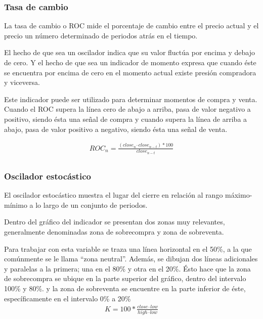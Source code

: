 
\pagebreak

\subsubsection*{Tasa de cambio}
La tasa de cambio o ROC mide el porcentaje de cambio entre el precio actual y el precio un número determinado de periodos atrás en el tiempo.

El hecho de que sea un oscilador indica que su valor fluctúa por encima y debajo de cero. Y el hecho de que sea un indicador de momento expresa que cuando éste se encuentra por encima de cero en el momento actual existe presión compradora y viceversa.

Este indicador puede ser utilizado para determinar momentos de compra y venta. Cuando el ROC supera la línea cero de abajo a arriba, pasa de valor negativo a positivo, siendo ésta  una señal de compra y cuando supera la línea de arriba a abajo, pasa de valor positivo a negativo, siendo ésta  una señal de venta.

\begin{gather*}
\label{eqn:ROC}
ROC_n = \frac{(close_n – close_{n-t}) * 100}{close_{n-t}}\\
\end{gather*}


\pagebreak




\subsubsection*{Oscilador estocástico}
El oscilador estocástico muestra el lugar del cierre en relación al rango máximo-mínimo a lo largo de un conjunto de periodos. 

Dentro del gráfico del indicador se presentan dos zonas muy relevantes, generalmente denominadas zona de sobrecompra y zona de sobreventa.

Para trabajar con esta variable se traza una línea horizontal en el 50\%, a la que comúnmente se le llama “zona neutral”. Además, se dibujan dos líneas adicionales y paralelas a la primera; una en el 80\% y otra en el 20\%. Ésto hace que la zona de sobrecompra se ubique en la parte superior del gráfico, dentro del intervalo 100\% y 80\%. y la zona de sobreventa se encuentre en la parte inferior de éste, específicamente en el intervalo 0\% a 20\%
\begin{gather*}
\label{eqn:OE}
K = 100 * \frac{close – low}{high – low} \\ 
\end{gather*}

